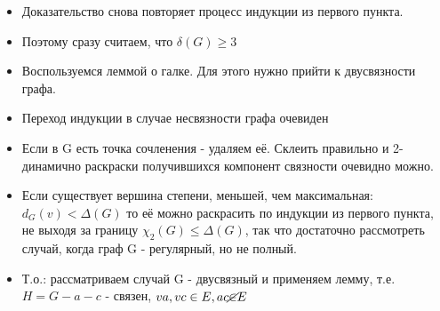 \documentclass[12pt,a4paper]{article}
\theoremstyle{plain} %
\theoremstyle{definition} %
\theoremstyle{remark} %
\begin{document}
	\begin {itemize}
	\item Доказательство снова повторяет процесс индукции из первого пункта.
	\item Поэтому сразу считаем, что $\delta(G) \geq 3$
	\item Воспользуемся леммой о галке. Для этого нужно прийти к двусвязности графа.
	\item Переход индукции в случае несвязности графа очевиден
	\item Если в G есть точка сочленения - удаляем её. Склеить правильно и 2-динамично раскраски получившихся компонент связности очевидно можно.
	\item Если существует вершина степени, меньшей, чем максимальная: $d_G(v) < \Delta(G)$ то её можно раскрасить по индукции из первого пункта, не выходя за границу $\chi_2(G) \leq \Delta(G)$, так что достаточно рассмотреть случай, когда граф G - регулярный, но не полный.
	\item Т.о.: рассматриваем случай G - двусвязный и применяем лемму, т.е. $H = G-a-c$ - связен, $va,vc \in E, ac \cancel{\in} E$
	

\end{itemize}
\end{document}
